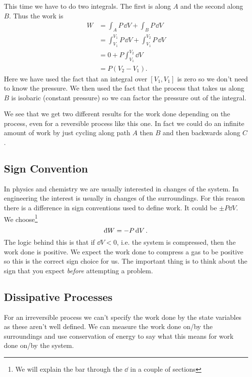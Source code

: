 \documentclass[a4paper]{article}
\newcommand{\ddbar}[1]{\text{\dj}{#1}}
\begin{document}
\begin{example}
        This time we have to do two integrals.
        The first is along \(A\) and the second along \(B\).
        Thus the work is
        \begin{align*}
            W &= \int_A P\,\dd{V} + \int_B P\,\dd{V}\\
            &= \int_{V_1}^{V_1}P\,\dd{V} + \int_{V_1}^{V_2}P\,\dd{V}\\
            &= 0 + P\int_{V_1}^{V_2}\dd{V}\\
            &= P(V_2 - V_1).
        \end{align*}
        Here we have used the fact that an integral over \([V_1, V_1]\) is zero so we don't need to know the pressure.
        We then used the fact that the process that takes us along \(B\) is isobaric (constant pressure) so we can factor the pressure out of the integral.
        
        We see that we get two different results for the work done depending on the process, even for a reversible process like this one.
        In fact we could do an infinite amount of work by just cycling along path \(A\) then \(B\) and then backwards along \(C\).
    \end{example}
    
    \subsection{Sign Convention}
    In physics and chemistry we are usually interested in changes of the system.
    In engineering the interest is usually in changes of the surroundings.
    For this reason there is a difference in sign conventions used to define work.
    It could be \(\pm P\dd{V}\).
    We choose\footnote{We will explain the bar through the \(\dd\) in a couple of sections}
    \[\ddbar{W} = -P\dd{V}.\]
    The logic behind this is that if \(\dd{V} < 0\), i.e. the system is compressed, then the work done is positive.
    We expect the work done to compress a gas to be positive so this is the correct sign choice for us.
    The important thing is to think about the sign that you expect \emph{before} attempting a problem.
    
    \subsection{Dissipative Processes}
    For an irreversible process we can't specify the work done by the state variables as these aren't well defined.
    We can measure the work done on/by the surroundings and use conservation of energy to say what this means for work done on/by the system.
    
\end{document}
